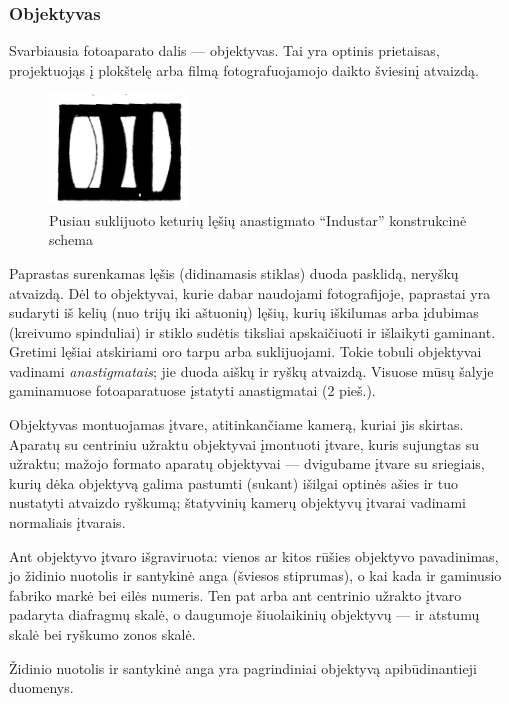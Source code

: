\documentclass[12pt]{book}
\begin{document}
				\subsubsection*{Objektyvas}
					Svarbiausia fotoaparato dalis --- objektyvas. Tai yra optinis prietaisas, projektuojąs į plokštelę arba filmą fotografuojamojo daikto šviesinį atvaizdą.
					\begin{figure}
						\centering
						\includegraphics[width=0.33\textwidth]{2-pav}
						\caption{Pusiau suklijuoto keturių lęšių anastigmato ``Industar'' konstrukcinė schema}
						\label{fig:2}
					\end{figure}
					Paprastas surenkamas lęšis (didinamasis stiklas) duoda pasklidą, neryškų atvaizdą. Dėl to objektyvai, kurie dabar naudojami fotografijoje, paprastai yra sudaryti iš kelių (nuo trijų iki aštuonių) lęšių, kurių iškilumas arba įdubimas (kreivumo spinduliai) ir stiklo sudėtis tiksliai apskaičiuoti ir išlaikyti gaminant. Gretimi lęšiai atskiriami oro tarpu arba suklijuojami. Tokie tobuli objektyvai vadinami \textit{anastigmatais}; jie duoda aiškų ir ryškų atvaizdą. Visuose mūsų šalyje gaminamuose fotoaparatuose įstatyti anastigmatai (2 pieš.).

					Objektyvas montuojamas įtvare, atitinkančiame kamerą, kuriai jis skirtas. Aparatų su centriniu užraktu objektyvai įmontuoti įtvare, kuris sujungtas su užraktu; mažojo formato aparatų objektyvai --- dvigubame įtvare su sriegiais, kurių dėka objektyvą galima pastumti (sukant) išilgai optinės ašies ir tuo nustatyti atvaizdo ryškumą; štatyvinių kamerų objektyvų įtvarai vadinami normaliais įtvarais.

					Ant objektyvo įtvaro išgraviruota: vienos ar kitos rūšies objektyvo pavadinimas, jo židinio nuotolis ir santykinė anga (šviesos stiprumas), o kai kada ir gaminusio fabriko markė bei eilės numeris. Ten pat arba ant centrinio užrakto įtvaro padaryta diafragmų skalė, o daugumoje šiuolaikinių objektyvų --- ir atstumų skalė bei ryškumo zonos skalė.

					Židinio nuotolis ir santykinė anga yra pagrindiniai objektyvą apibūdinantieji duomenys.\\
				
\end{document}
